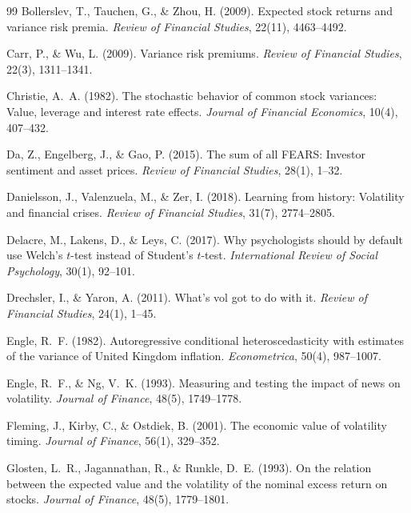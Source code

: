 \documentclass[12pt,a4paper]{article}
\begin{document}
\begin{thebibliography}{99}
Bollerslev, T., Tauchen, G., \& Zhou, H. (2009). Expected stock returns and variance risk premia. \textit{Review of Financial Studies}, 22(11), 4463--4492.

Carr, P., \& Wu, L. (2009). Variance risk premiums. \textit{Review of Financial Studies}, 22(3), 1311--1341.

Christie, A.~A. (1982). The stochastic behavior of common stock variances: Value, leverage and interest rate effects. \textit{Journal of Financial Economics}, 10(4), 407--432.

Da, Z., Engelberg, J., \& Gao, P. (2015). The sum of all FEARS: Investor sentiment and asset prices. \textit{Review of Financial Studies}, 28(1), 1--32.

Danielsson, J., Valenzuela, M., \& Zer, I. (2018). Learning from history: Volatility and financial crises. \textit{Review of Financial Studies}, 31(7), 2774--2805.

Delacre, M., Lakens, D., \& Leys, C. (2017). Why psychologists should by default use Welch's $t$-test instead of Student's $t$-test. \textit{International Review of Social Psychology}, 30(1), 92--101.

Drechsler, I., \& Yaron, A. (2011). What's vol got to do with it. \textit{Review of Financial Studies}, 24(1), 1--45.

Engle, R.~F. (1982). Autoregressive conditional heteroscedasticity with estimates of the variance of United Kingdom inflation. \textit{Econometrica}, 50(4), 987--1007.

Engle, R.~F., \& Ng, V.~K. (1993). Measuring and testing the impact of news on volatility. \textit{Journal of Finance}, 48(5), 1749--1778.

Fleming, J., Kirby, C., \& Ostdiek, B. (2001). The economic value of volatility timing. \textit{Journal of Finance}, 56(1), 329--352.

Glosten, L.~R., Jagannathan, R., \& Runkle, D.~E. (1993). On the relation between the expected value and the volatility of the nominal excess return on stocks. \textit{Journal of Finance}, 48(5), 1779--1801.


\end{thebibliography}
\end{document}

